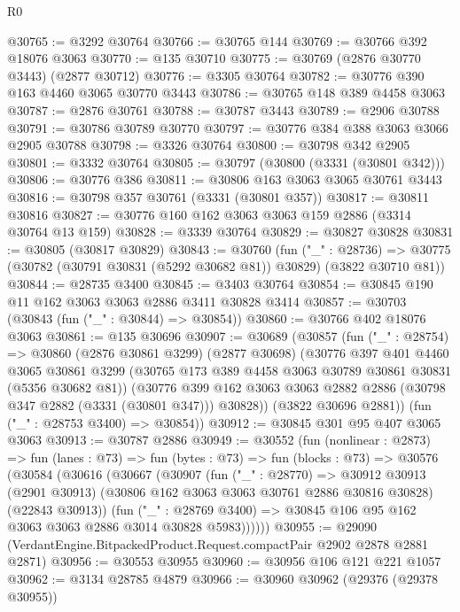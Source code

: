 \begin{lexlean}{R0}
\begin{coremodule}
@30765 := @3292 @30764
@30766 := @30765 @144
@30769 := @30766 @392 @18076 @3063
@30770 := @135 @30710
@30775 := @30769 (@2876 @30770 @3443) (@2877 @30712)
@30776 := @3305 @30764
@30782 := @30776 @390 @163 @4460 @3065 @30770 @3443
@30786 := @30765 @148 @389 @4458 @3063
@30787 := @2876 @30761
@30788 := @30787 @3443
@30789 := @2906 @30788
@30791 := @30786 @30789 @30770
@30797 := @30776 @384 @388 @3063 @3066 @2905 @30788
@30798 := @3326 @30764
@30800 := @30798 @342 @2905
@30801 := @3332 @30764
@30805 := @30797 (@30800 (@3331 (@30801 @342)))
@30806 := @30776 @386
@30811 := @30806 @163 @3063 @3065 @30761 @3443
@30816 := @30798 @357 @30761 (@3331 (@30801 @357))
@30817 := @30811 @30816
@30827 := @30776 @160 @162 @3063 @3063 @159 @2886 (@3314 @30764 @13 @159)
@30828 := @3339 @30764
@30829 := @30827 @30828
@30831 := @30805 (@30817 @30829)
@30843 := @30760
    (fun ("_" : @28736) =>
    @30775 (@30782 (@30791 @30831 (@5292 @30682 @81)) @30829) (@3822 @30710 @81))
@30844 := @28735 @3400
@30845 := @3403 @30764
@30854 := @30845 @190 @11 @162 @3063 @3063 @2886 @3411 @30828 @3414
@30857 := @30703 (@30843 (fun ("_" : @30844) => @30854))
@30860 := @30766 @402 @18076 @3063
@30861 := @135 @30696
@30907 := @30689
    (@30857
      (fun ("_" : @28754) =>
      @30860
        (@2876 @30861 @3299)
        (@2877 @30698)
        (@30776
          @397
          @401
          @4460
          @3065
          @30861
          @3299
          (@30765 @173 @389 @4458 @3063 @30789 @30861 @30831 (@5356 @30682 @81))
          (@30776
            @399
            @162
            @3063
            @3063
            @2882
            @2886
            (@30798 @347 @2882 (@3331 (@30801 @347)))
            @30828))
        (@3822 @30696 @2881))
      (fun ("_" : @28753 @3400) => @30854))
@30912 := @30845 @301 @95 @407 @3065 @3063
@30913 := @30787 @2886
@30949 := @30552
    (fun (nonlinear : @2873) =>
    fun (lanes : @73) =>
    fun (bytes : @73) =>
    fun (blocks : @73) =>
    @30576
      (@30584
        (@30616
          (@30667
            (@30907
              (fun ("_" : @28770) =>
              @30912
                @30913
                (@2901 @30913)
                (@30806 @162 @3063 @3063 @30761 @2886 @30816 @30828)
                (@22843 @30913))
              (fun ("_" : @28769 @3400) =>
              @30845 @106 @95 @162 @3063 @3063 @2886 @3014 @30828 @5983))))))
@30955 := @29090 (VerdantEngine.BitpackedProduct.Request.compactPair @2902 @2878 @2881 @2871)
@30956 := @30553 @30955
@30960 := @30956 @106 @121 @221 @1057
@30962 := @3134 @28785 @4879
@30966 := @30960 @30962 (@29376 (@29378 @30955))

\end{coremodule}
\end{lexlean}
